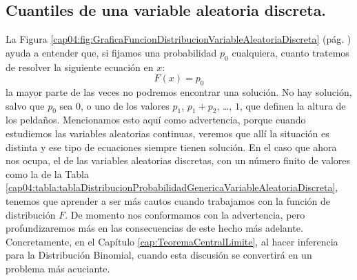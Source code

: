 \subsection{Cuantiles de una variable aleatoria discreta.}
\label{cap04:subsec:CuantilesVariableAleatoriaDiscreta}
La Figura \ref{cap04:fig:GraficaFuncionDistribucionVariableAleatoriaDiscreta} (pág. \pageref{cap04:fig:GraficaFuncionDistribucionVariableAleatoriaDiscreta}) ayuda a entender que, si fijamos una probabilidad $p_0$ cualquiera, cuanto tratemos de resolver la siguiente ecuación en $x$:
\[F(x)=p_0\]
la mayor parte de las veces no podremos encontrar una solución. No hay solución, salvo que $p_0$ sea $0$, o uno de los valores $p_1$, $p_1+p_2$, \ldots, $1$, que definen la altura de los peldaños. Mencionamos esto aquí como advertencia,  porque cuando estudiemos las variables aleatorias continuas, veremos que allí la situación es distinta y ese tipo de ecuaciones siempre tienen solución. En el caso que ahora nos ocupa, el de las variables aleatorias discretas, con un número finito de valores como la de la Tabla \ref{cap04:tabla:tablaDistribucionProbabilidadGenericaVariableAleatoriaDiscreta}, tenemos que aprender a ser más cautos cuando trabajamos con la función de distribución $F$. De momento nos conformamos con la advertencia, pero profundizaremos más en las consecuencias de este hecho más adelante. Concretamente, en el Capítulo \ref{cap:TeoremaCentralLimite}, al hacer inferencia para la Distribución Binomial, cuando esta discusión se convertirá en un problema más acuciante.

